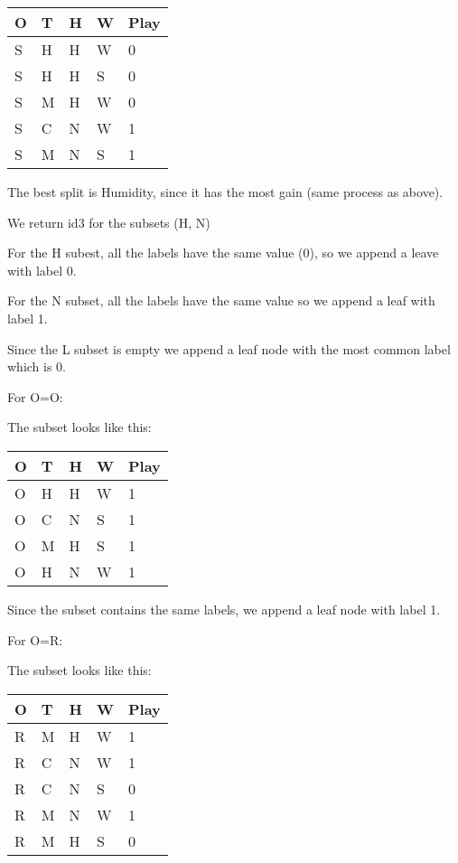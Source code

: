 \documentclass[12pt, fullpage,letterpaper]{article}
\begin{document}
\begin{enumerate}
\begin{enumerate}
		\begin{tabular}{|l|l|l|l|l|}
			\hline
			O & T & H & W & Play \\ \hline
			S & H & H & W & 0    \\ \hline
			S & H & H & S & 0    \\ \hline
			S & M & H & W & 0    \\ \hline
			S & C & N & W & 1    \\ \hline
			S & M & N & S & 1    \\ \hline
			\end{tabular}
		
		The best split is Humidity, since it has the most gain (same process as above).
		
		We return id3 for the subsets (H, N)
		
		For the H subest, all the labels have the same value (0), so we append a leave with label 0.
		
		For the N subset, all the labels have the same value so we append a leaf with label 1.
		
		Since the L subset is empty  we append a leaf node with the most common label which is 0. 
		
		For O=O:
		
		The subset looks like this:
		
		\begin{tabular}{|l|l|l|l|l|}
			\hline
			O & T & H & W & Play \\ \hline
			O & H & H & W & 1    \\ \hline
			O & C & N & S & 1    \\ \hline
			O & M & H & S & 1    \\ \hline
			O & H & N & W & 1    \\ \hline
			\end{tabular}
		
		
		Since the subset contains the same labels, we append a leaf node with label 1.
		
		For O=R:
		
		The subset looks like this:
		
		\begin{tabular}{|l|l|l|l|l|}
			\hline
			O & T & H & W & Play \\ \hline
			R & M & H & W & 1    \\ \hline
			R & C & N & W & 1    \\ \hline
			R & C & N & S & 0    \\ \hline
			R & M & N & W & 1    \\ \hline
			R & M & H & S & 0    \\ \hline
			\end{tabular}
		

\end{enumerate}
\end{enumerate}
\end{document}
